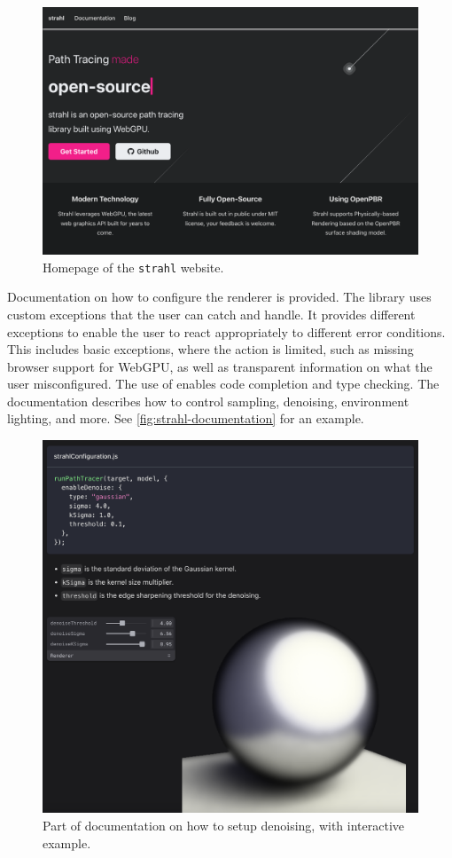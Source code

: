 \begin{figure}[H]
    \centering
    \includegraphics[width=0.7\columnwidth]{resources/website-home.png}
    \caption{Homepage of the \texttt{strahl} website.}
    \label{fig:strahl-homepage}
\end{figure}

Documentation on how to configure the renderer is provided. The library uses custom exceptions that the user can catch and handle. It provides different exceptions to enable the user to react appropriately to different error conditions. This includes basic exceptions, where the action is limited, such as missing browser support for \gls{WebGPU}, as well as transparent information on what the user misconfigured. The use of  enables code completion and type checking. The documentation describes how to control sampling, denoising, environment lighting, and more. See \autoref{fig:strahl-documentation} for an example.

\begin{figure}[H]
    \centering
    \includegraphics[width=0.7\columnwidth]{resources/website-documentation.png}
    \caption{Part of documentation on how to setup denoising, with interactive example.}
    \label{fig:strahl-documentation}
\end{figure}

